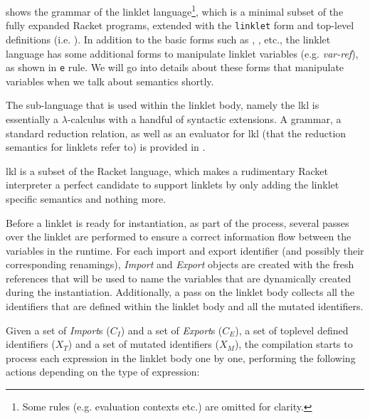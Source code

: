 		\begin{paragraph-here}%
			 shows the grammar of the linklet
			language\footnote{Some rules (e.g. evaluation contexts etc.) are omitted for clarity.}, which is a minimal subset of the fully expanded Racket
			programs, extended with the \verb|linklet| form and top-level
			definitions (i.e. ). In addition to the basic forms such
			as , ,  etc., the linklet language has
			some additional forms to manipulate linklet variables
			(e.g. \emph{var-ref}), as shown in \verb|e| rule. We will go into details about these forms that manipulate variables when we talk about  semantics shortly.
		\end{paragraph-here}

		\begin{paragraph-here}%
			The sub-language that is used within the linklet body,
			namely the \gls{lkl} is essentially a $\lambda$-calculus with a handful
			of syntactic extensions. A grammar, a standard reduction relation, as well as an evaluator for \gls{lkl} (that the reduction semantics for linklets refer to) is provided in \appendixRef{appendix:linklet-kernel-language}.

			\gls{lkl} is a subset of the Racket  language, which makes a rudimentary Racket interpreter a perfect candidate to support linklets by only adding the linklet specific semantics and nothing more.
		\end{paragraph-here}

		\begin{paragraph-here}
			Before a linklet is ready for instantiation, as part of the
			 process, several passes over the linklet are
			performed to ensure a correct information flow between the variables
			in the run\dash time. For each import and export identifier (and
			possibly their corresponding renamings), \emph{Import} and
			\emph{Export} objects are created with the fresh references that
			will be used to name the variables that are dynamically created during
			the instantiation. Additionally, a pass on the linklet body collects
			all the identifiers that are defined within the linklet body and all
			the mutated identifiers.
		\end{paragraph-here}



		\begin{paragraph-here}
			Given a set of \emph{Import}s ($\mathit{C_I}$) and a set of
			\emph{Export}s ($\mathit{C_E}$), a set of toplevel defined
			identifiers ($\mathit{X_T}$) and a set of mutated identifiers
			($\mathit{X_M}$), the compilation starts to process each expression in
			the linklet body one by one, performing the following actions
			depending on the type of expression:

		\end{paragraph-here}

